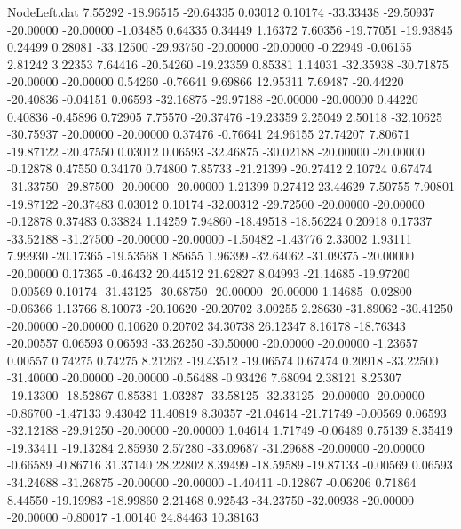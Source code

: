 \begin{filecontents}{NodeLeft.dat}
   7.55292  -18.96515  -20.64335     0.03012    0.10174  -33.33438  -29.50937  -20.00000  -20.00000   -1.03485    0.64335    0.34449    1.16372
   7.60356  -19.77051  -19.93845     0.24499    0.28081  -33.12500  -29.93750  -20.00000  -20.00000   -0.22949   -0.06155    2.81242    3.22353
   7.64416  -20.54260  -19.23359     0.85381    1.14031  -32.35938  -30.71875  -20.00000  -20.00000    0.54260   -0.76641    9.69866   12.95311
   7.69487  -20.44220  -20.40836    -0.04151    0.06593  -32.16875  -29.97188  -20.00000  -20.00000    0.44220    0.40836   -0.45896    0.72905
   7.75570  -20.37476  -19.23359     2.25049    2.50118  -32.10625  -30.75937  -20.00000  -20.00000    0.37476   -0.76641   24.96155   27.74207
   7.80671  -19.87122  -20.47550     0.03012    0.06593  -32.46875  -30.02188  -20.00000  -20.00000   -0.12878    0.47550    0.34170    0.74800
   7.85733  -21.21399  -20.27412     2.10724    0.67474  -31.33750  -29.87500  -20.00000  -20.00000    1.21399    0.27412   23.44629    7.50755
   7.90801  -19.87122  -20.37483     0.03012    0.10174  -32.00312  -29.72500  -20.00000  -20.00000   -0.12878    0.37483    0.33824    1.14259
   7.94860  -18.49518  -18.56224     0.20918    0.17337  -33.52188  -31.27500  -20.00000  -20.00000   -1.50482   -1.43776    2.33002    1.93111
   7.99930  -20.17365  -19.53568     1.85655    1.96399  -32.64062  -31.09375  -20.00000  -20.00000    0.17365   -0.46432   20.44512   21.62827
   8.04993  -21.14685  -19.97200    -0.00569    0.10174  -31.43125  -30.68750  -20.00000  -20.00000    1.14685   -0.02800   -0.06366    1.13766
   8.10073  -20.10620  -20.20702     3.00255    2.28630  -31.89062  -30.41250  -20.00000  -20.00000    0.10620    0.20702   34.30738   26.12347
   8.16178  -18.76343  -20.00557     0.06593    0.06593  -33.26250  -30.50000  -20.00000  -20.00000   -1.23657    0.00557    0.74275    0.74275
   8.21262  -19.43512  -19.06574     0.67474    0.20918  -33.22500  -31.40000  -20.00000  -20.00000   -0.56488   -0.93426    7.68094    2.38121
   8.25307  -19.13300  -18.52867     0.85381    1.03287  -33.58125  -32.33125  -20.00000  -20.00000   -0.86700   -1.47133    9.43042   11.40819
   8.30357  -21.04614  -21.71749    -0.00569    0.06593  -32.12188  -29.91250  -20.00000  -20.00000    1.04614    1.71749   -0.06489    0.75139
   8.35419  -19.33411  -19.13284     2.85930    2.57280  -33.09687  -31.29688  -20.00000  -20.00000   -0.66589   -0.86716   31.37140   28.22802
   8.39499  -18.59589  -19.87133    -0.00569    0.06593  -34.24688  -31.26875  -20.00000  -20.00000   -1.40411   -0.12867   -0.06206    0.71864
   8.44550  -19.19983  -18.99860     2.21468    0.92543  -34.23750  -32.00938  -20.00000  -20.00000   -0.80017   -1.00140   24.84463   10.38163

\end{filecontents}
